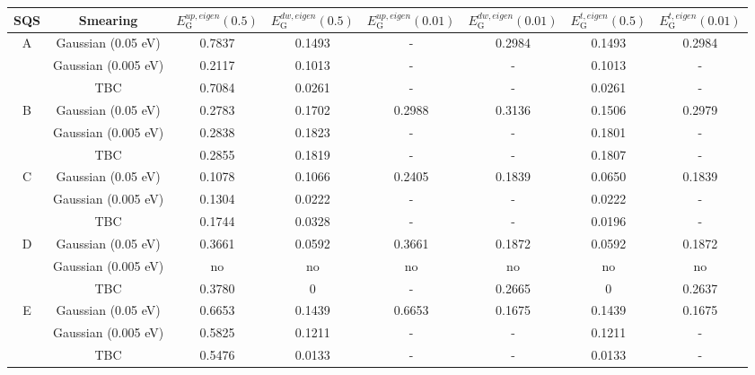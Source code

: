 \newpage
\begin{landscape}
\begin{table}[H]
\centering
\begin{tabular}{@{}cccccccc@{}}
\toprule
SQS                                     & Smearing         & $E_\text{G} ^{up, eigen}(0.5)$ & $E_\text{G} ^{dw, eigen}(0.5)$ & $E_\text{G} ^{up, eigen}(0.01)$ & $E_\text{G} ^{dw, eigen}(0.01)$ & $E_\text{G} ^{t, eigen}(0.5)$ & $E_\text{G} ^{t, eigen}(0.01)$ \\ \midrule
\multicolumn{1}{c|}{\multirow{3}{*}{A}} & Gaussian (0.05 eV)  & 0.7837   & 0.1493   & -        & 0.2984   & 0.1493 & 0.2984  \\
\multicolumn{1}{c|}{}                   & Gaussian (0.005 eV) & 0.2117   & 0.1013   & -        & -        & 0.1013 & -       \\
\multicolumn{1}{c|}{}                   & TBC              & 0.7084   & 0.0261   & -        & -        & 0.0261 & -       \\ \midrule
\multicolumn{1}{c|}{\multirow{3}{*}{B}} & Gaussian (0.05 eV)  & 0.2783   & 0.1702   & 0.2988   & 0.3136   & 0.1506 & 0.2979  \\
\multicolumn{1}{c|}{}                   & Gaussian (0.005 eV) & 0.2838   & 0.1823   & -        & -        & 0.1801 & -       \\
\multicolumn{1}{c|}{}                   & TBC              & 0.2855   & 0.1819   & -        & -        & 0.1807 & -       \\ \midrule
\multicolumn{1}{c|}{\multirow{3}{*}{C}} & Gaussian (0.05 eV)  & 0.1078   & 0.1066   & 0.2405   & 0.1839   & 0.0650 & 0.1839  \\
\multicolumn{1}{c|}{}                   & Gaussian (0.005 eV) & 0.1304   & 0.0222   & -        & -        & 0.0222 & -       \\
\multicolumn{1}{c|}{}                   & TBC              & 0.1744   & 0.0328   & -        & -        & 0.0196 & -       \\ \midrule
\multicolumn{1}{c|}{\multirow{3}{*}{D}} & Gaussian (0.05 eV)  & 0.3661   & 0.0592   & 0.3661   & 0.1872   & 0.0592 & 0.1872  \\
\multicolumn{1}{c|}{}                   & Gaussian (0.005 eV) & no       & no       & no       & no       & no     & no      \\
\multicolumn{1}{c|}{}                   & TBC              & 0.3780   & 0        & -        & 0.2665   & 0      & 0.2637  \\ \midrule
\multicolumn{1}{c|}{\multirow{3}{*}{E}} & Gaussian (0.05 eV)  & 0.6653   & 0.1439   & 0.6653   & 0.1675   & 0.1439 & 0.1675  \\
\multicolumn{1}{c|}{}                   & Gaussian (0.005 eV) & 0.5825   & 0.1211   & -        & -        & 0.1211 & -       \\
\multicolumn{1}{c|}{}                   & TBC              & 0.5476   & 0.0133   & -        & -        & 0.0133 & -       \\ \bottomrule
\end{tabular}
\end{table}
\end{landscape}
\newpage

